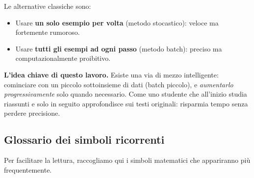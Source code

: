 \documentclass[a4paper,12pt]{article}
\numberwithin{equation}{section}
\numberwithin{figure}{section}
\numberwithin{table}{section}
\begin{document}
Le alternative classiche sono:
\begin{itemize}
    \item Usare \textbf{un solo esempio per volta} (metodo stocastico): veloce ma fortemente rumoroso.
    \item Usare \textbf{tutti gli esempi ad ogni passo} (metodo batch): preciso ma computazionalmente proibitivo.
\end{itemize}

\begin{intuitionbox}
  \textbf{L'idea chiave di questo lavoro.} Esiste una via di mezzo intelligente: cominciare con un piccolo sottoinsieme di dati (batch piccolo), e \emph{aumentarlo progressivamente} solo quando necessario. Come uno studente che all'inizio studia riassunti e solo in seguito approfondisce sui testi originali: risparmia tempo senza perdere precisione.
\end{intuitionbox}

\subsection{Glossario dei simboli ricorrenti}

Per facilitare la lettura, raccogliamo qui i simboli matematici che appariranno pi\`u frequentemente.
\end{document}
